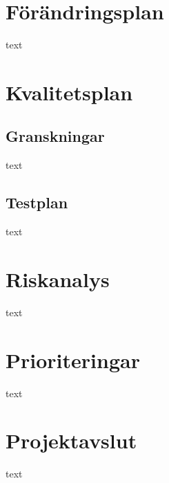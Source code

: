 \documentclass[11pt]{article}
\begin{document}
\begin{flushleft}
\pagebreak
\section{Förändringsplan}
text

\pagebreak
\section{Kvalitetsplan}
\subsection{Granskningar}
text

\subsection{Testplan}
text

\pagebreak
\section{Riskanalys}
text

\pagebreak
\section{Prioriteringar}
text

\pagebreak
\section{Projektavslut}
text

\end{flushleft}
\end{document}
